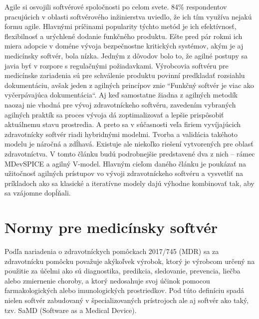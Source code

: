 \documentclass[10pt,twoside,slovak,a4paper]{article}
\begin{document}
Agile si osvojili softvérové spoločnosti po celom svete. 84\% respondentov pracujúcich v oblasti softvérového inžinierstva uviedlo, že ich tím využíva nejakú formu agile. Hlavnými príčinami popularity týchto metód je ich efektívnosť, flexibilnosť a urýchlené dodanie funkčného produktu\cite{agileReport}. Ešte pred pár rokmi ich miera adopcie v doméne vývoja bezpečnostne kritických systémov, akým je aj medicínsky softvér, bola nízka. Jedným z dôvodov bolo to, že agilné postupy sa javia byť v rozpore s regulačnými požiadavkami. Výrobcovia softvéru pre medicínske zariadenia sú pre schválenie produktu povinní predkladať rozsiahlu dokumentáciu, avšak jeden z agilných princípov znie “Funkčný softvér je viac ako vyčerpávajúca dokumentácia“\cite{mchugh2013}. Aj keď samostatne žiadna z agilných metodík naozaj nie vhodná pre vývoj zdravotníckeho softvéru, zavedením vybraných agilných praktík sa proces vývoja dá zoptimalizovať a lepšie prispôsobiť aktuálnemu stavu prostredia\cite{mccaffery2019}. A preto sa v súčasnosti veľa firiem vyvíjajúcich zdravotnícky softvér riadi hybridnými modelmi\cite{hybridReport}. Tvorba a validácia takéhoto modelu je náročná a zdĺhavá. Existuje ale niekoľko riešení vytvorených pre oblasť zdravotníctva. V tomto článku budú podrobnejšie predstavené dva z nich – rámec MDevSPICE a agilný V-model. Hlavným cieľom daného článku je poukázať na užitočnosť agilných prístupov vo vývoji zdravotníckeho softvéru a vysvetliť na príkladoch ako sa klasické a iteratívne modely dajú výhodne kombinovať tak, aby sa vzájomne dopĺňali. 

\section{Normy pre medicínsky softvér}
Podľa nariadenia o zdravotníckych pomôckach 2017/745 (MDR) sa za zdravotnícku pomôcku považuje akýkoľvek výrobok, ktorý je výrobcom určený na použitie za účelmi ako sú diagnostika, predikcia, sledovanie, prevencia, liečba alebo zmiernenie choroby, a ktorý nedosahuje svoj účinok pomocou farmakologických alebo imunologických prostriedkov. Pod túto definíciu spadá nielen softvér zabudovaný v špecializovaných prístrojoch ale aj softvér ako taký, tzv. SaMD (Software as a Medical Device)\cite{bronneke2021}.
\end{document}
